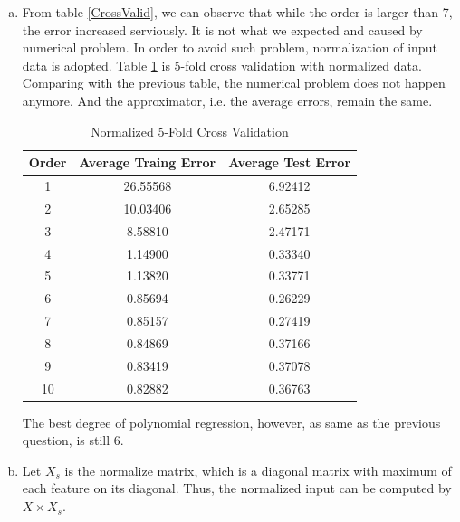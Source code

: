 \documentclass[a4paper, 12pt, titlepage]{article}
\begin{document}
\begin{enumerate}[(a)]
            Figure \ref{f} plots the data and the result of 6-order polynomial regression.

            \begin{figure}[H]
                \centering
                \texttt{[image: fig/6-order.eps]}
                \caption{6-order Regression}\label{g}
            \end{figure}

            Error = 1.0936

        \item From table \ref{CrossValid}, we can observe that while the order is larger than 7, the error increased serviously. It is not what we expected and caused by numerical problem. In order to avoid such problem, normalization of input data is adopted. Table \ref{NCrossValid} is 5-fold cross validation with normalized data. Comparing with the previous table, the numerical problem does not happen anymore. And the approximator, i.e. the average errors, remain the same.
            \begin{table}[H]
                \centering
                \begin{tabular}{ccc}
                Order & Average Traing Error & Average Test Error \\
                    \hline
                1 & 26.55568 & 6.92412 \\
                2 & 10.03406 & 2.65285 \\
                3 & 8.58810  & 2.47171 \\
                4 & 1.14900  & 0.33340 \\
                5 & 1.13820  & 0.33771 \\
                6 & 0.85694  & 0.26229 \\
                7 & 0.85157  & 0.27419 \\
                8 & 0.84869  & 0.37166 \\
                9 & 0.83419  & 0.37078 \\
                10 & 0.82882  & 0.36763 \\
                \end{tabular}
                \caption{Normalized 5-Fold Cross Validation}
                \label{NCrossValid}
            \end{table}

            The best degree of polynomial regression, however, as same as the previous question, is still 6.

        \item Let $X_s$ is the normalize matrix, which is a diagonal matrix with maximum of each feature on its diagonal. Thus, the normalized input can be computed by $X\times{}X_s$.
            


\end{enumerate}
\end{document}
